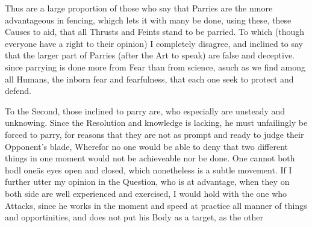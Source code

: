 Thus are a large proportion of those who say that Parries are the
nmore advantageous in fencing, whigch lets it with many be done, using
these, these Causes to aid, that all Thrusts and Feints stand to be
parried. To which (though everyone have a right to their opinion) I
completely disagree, and inclined to say that the larger part of
Parries (after the Art to speak) are false and deceptive. since
parrying is done more from Fear than from science, asuch as we find
among all Humans, the inborn fear and fearfulness, that each one seek
to protect and defend.


To the Second, those inclined to parry are, who especially are
unsteady and unknowing. Since the Resolution and knowledge is lacking,
he must unfailingly be forced to parry, for reasons that they are not
as prompt and ready to judge their Opponent's blade,
Wherefor no one would be able to deny that two different things in one
moment would not be achieveable nor be done. One cannot both hodl
oneäs eyes open and closed, which nonetheless is a subtle movement.
If I further utter my opinion in the Question, who is at advantage,
when they on both side are well experienced and exercised, I would
hold with the one who Attacks, since he works in the moment and speed
at practice all manner of things and opportinities, and does not put
his Body as a target, as the other

